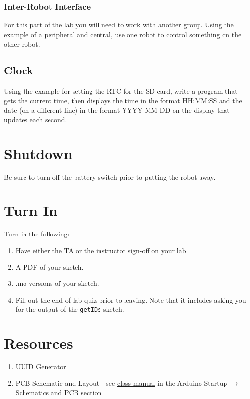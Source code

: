 \subsubsection{Inter-Robot Interface}
For this part of the lab you will need to work with another group. Using the example 
of a peripheral and central, use one robot to control something on the other robot.

\subsection{Clock}
Using the example for setting the RTC for the SD card, write a 
program that gets the current time, then displays the time in the 
format HH:MM:SS and the date (on a different line) in the format 
YYYY-MM-DD on the display that updates each second.

\section{Shutdown}
Be sure to turn off the battery switch prior to putting the robot away.

\section{Turn In}
Turn in the following:
\begin{enumerate}
    \item Have either the TA or the instructor sign-off on your lab
    \item A PDF of your sketch.
    \item .ino versions of your sketch.
    \item Fill out the end of lab quiz prior to leaving. Note that it includes asking you 
            for the output of the \lstinline$getIDs$ sketch. 
\end{enumerate}

\section{Resources}%
\begin{enumerate}
    \item \href{https://www.uuidgenerator.net/}{UUID Generator} 
    \item PCB Schematic and Layout - see 
            \href{https://github.com/semcneil/Fundamentals-of-Microcontrollers-Manual}{class manual} 
            in the Arduino Startup $\rightarrow$ Schematics and PCB section
\end{enumerate}

